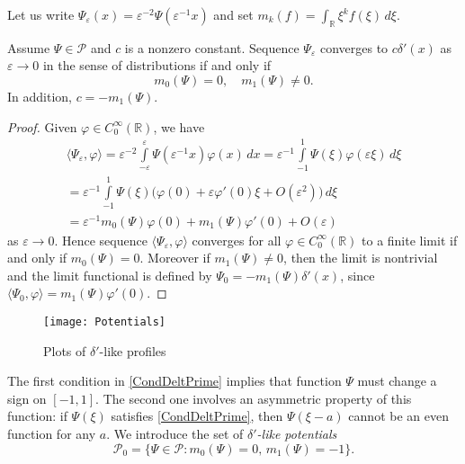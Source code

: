 \documentclass[11pt,english]{amsart}
\begin{document}
Let us write $\Psi_\varepsilon(x)=\varepsilon^{-2}\Psi(\varepsilon^{-1}x)$ and set $m_k(f)=\int_{\mathbb{R}}\xi^k f(\xi)\,d\xi$.
\begin{g_lemma}\label{LemDelFunc}
Assume $\Psi\in \mathcal{P}$ and  $c$ is a nonzero constant. Sequence $\Psi_\varepsilon$ converges to $c\delta'(x)$ as $\varepsilon\to 0$ in the sense of distributions  if and only if
\begin{equation}\label{CondDeltPrime}
    m_0(\Psi)=0, \quad m_1(\Psi)\neq 0.
\end{equation}
In addition, $c=-m_1(\Psi)$.
\end{g_lemma}
\begin{proof}
Given $\varphi\in C_0^\infty(\mathbb{R})$, we have
\begin{multline*}
\langle\Psi_\varepsilon,\varphi\rangle=
\varepsilon^{-2}\int\limits_{-\varepsilon}^{\varepsilon}
\Psi(\varepsilon^{-1}x)\varphi(x)\,dx=
\varepsilon^{-1}\int\limits_{-1}^1 \Psi(\xi)\varphi(\varepsilon\xi)\,d\xi\\
=\varepsilon^{-1}\int\limits_{-1}^1
\Psi(\xi)\bigl(\varphi(0)+\varepsilon\varphi'(0)\xi+O(\varepsilon^2)\bigr)\,d\xi\\=
\varepsilon^{-1}m_0(\Psi)\varphi(0)+m_1(\Psi)\varphi'(0)+O(\varepsilon)
\end{multline*}
as $\varepsilon \to 0$. Hence sequence $\langle\Psi_\varepsilon,\varphi\rangle$ converges for all $\varphi\in C_0^\infty(\mathbb{R})$ to a finite limit  if and only if $m_0(\Psi)=0$.
Moreover if $m_1(\Psi)\neq 0$, then the limit is nontrivial and the limit functional is defined by  $\Psi_0=-m_1(\Psi)\delta'(x)$, since $\langle\Psi_0,\varphi\rangle=m_1(\Psi)\varphi'(0)$.
\end{proof}

\begin{figure}[h]
\centering
  \texttt{[image: Potentials]}
  \caption{Plots of $\delta'$-like profiles}\label{FigPotential}
\end{figure}

The first condition in \eqref{CondDeltPrime} implies that function $\Psi$ must change a sign on $[-1,1]$. The second one involves an asymmetric property of  this function: if $\Psi(\xi)$ satisfies \eqref{CondDeltPrime}, then $\Psi(\xi-a)$ cannot be an even function for any $a$.
We introduce the set of \emph{$\delta'$-like potentials}
$$\mathcal{P}_0=\{\Psi\in \mathcal{P}\colon m_0(\Psi)=0,\, m_1(\Psi)=-1 \}.$$
\end{document}
